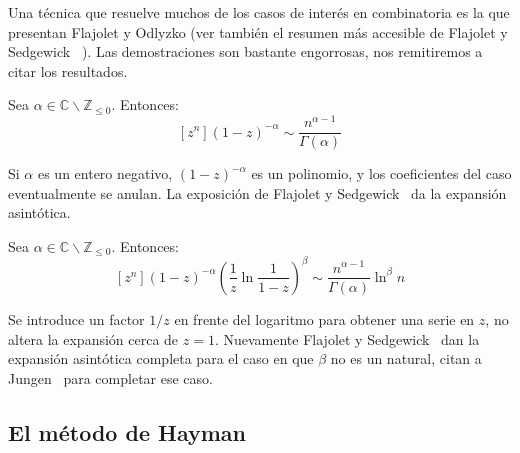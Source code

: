   Una técnica que resuelve muchos de los casos de interés en combinatoria
  es la que presentan Flajolet y Odlyzko\cite{flajolet90:_singular_anal}
  (ver también el resumen más accesible de Flajolet y Sedgewick~%
    \cite[sección~VI.2]{flajolet09:_analy_combin}).
  Las demostraciones son bastante engorrosas,
  nos remitiremos a citar los resultados.
  \begin{theorem}
    \label{theo:(1-z)^alpha}
    Sea \(\alpha \in \mathbb{C} \smallsetminus \mathbb{Z}_{\le 0}\).
    Entonces:
    \begin{equation}
      \label{eq:(1-z)^alpha-asy}
      [z^n] (1 - z)^{- \alpha}
	 \sim \frac{n^{\alpha - 1}}{\Gamma(\alpha)}
    \end{equation}
  \end{theorem}
  Si \(\alpha\) es un entero negativo,
  \((1 - z)^{- \alpha}\) es un polinomio,
  y los coeficientes del caso eventualmente se anulan.
  La exposición de Flajolet y Sedgewick~%
    \cite[teorema~VI.1]{flajolet09:_analy_combin}
  da la expansión asintótica.
  \begin{theorem}
    \label{theo:(1-z)^alpha*log(1-z)^beta}
    Sea \(\alpha \in \mathbb{C} \smallsetminus \mathbb{Z}_{\le 0}\).
    Entonces:
    \begin{equation}
      \label{eq:(1-z)^alpha*log(1-z)^beta-asy}
      [z^n] (1 - z)^{- \alpha}
	       \left(\frac{1}{z} \ln \frac{1}{1 - z}\right)^\beta
	 \sim \frac{n^{\alpha - 1}}{\Gamma(\alpha)}
		\ln^\beta n
    \end{equation}
  \end{theorem}
  Se introduce un factor \(1/z\) en frente del logaritmo
  para obtener una serie en \(z\),
  no altera la expansión cerca de \(z = 1\).
  Nuevamente Flajolet y Sedgewick~%
    \cite[teorema~VI.2]{flajolet09:_analy_combin}
  dan la expansión asintótica completa
  para el caso en que \(\beta\) no es un natural,
  citan a Jungen~\cite{jungen31:_sur_taylor} para completar ese caso.

\subsection{El método de Hayman}
\label{sec:Hayman-method}

